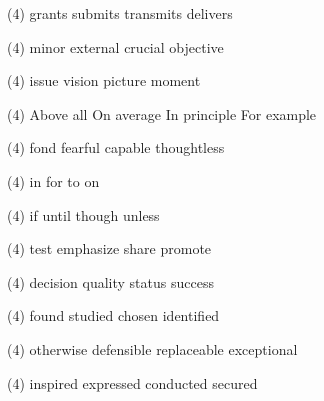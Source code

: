 \item
\begin{tasks}(4)
	\task grants
	\task submits
	\task transmits
	\task delivers
\end{tasks}
\item
\begin{tasks}(4)
	\task minor
	\task external
	\task crucial
	\task objective
\end{tasks}
\item
\begin{tasks}(4)
	\task issue
	\task vision
	\task picture
	\task moment
\end{tasks}
\item
\begin{tasks}(4)
	\task Above all
	\task On average
	\task In principle
	\task For example
\end{tasks}
\item
\begin{tasks}(4)
	\task fond
	\task fearful
	\task capable
	\task thoughtless
\end{tasks}
\item
\begin{tasks}(4)
	\task in
	\task for
	\task to
	\task on
\end{tasks}
\item
\begin{tasks}(4)
	\task if
	\task until
	\task though
	\task unless
\end{tasks}
\item
\begin{tasks}(4)
	\task test
	\task emphasize
	\task share
	\task promote
\end{tasks}
\item
\begin{tasks}(4)
	\task decision
	\task quality
	\task status
	\task success
\end{tasks}
\item
\begin{tasks}(4)
	\task found
	\task studied
	\task chosen
	\task identified
\end{tasks}
\item
\begin{tasks}(4)
	\task otherwise
	\task defensible
	\task replaceable
	\task exceptional
\end{tasks}
\item
\begin{tasks}(4)
	\task inspired
	\task expressed
	\task conducted
	\task secured
\end{tasks}
\item

